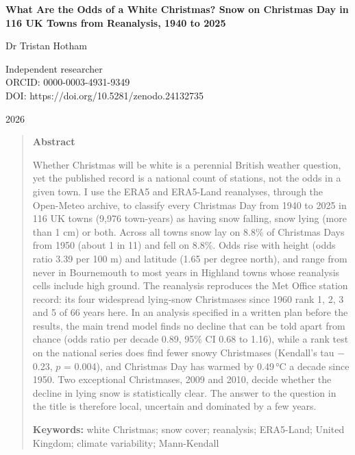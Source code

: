 \documentclass[11pt,a4paper]{article}
\begin{document}
\begin{center}
{\Large\bfseries What Are the Odds of a White Christmas? Snow on Christmas Day in 116 UK Towns from Reanalysis, 1940 to 2025\par}
\vspace{1.2em}
{\large Dr Tristan Hotham\par}
\vspace{0.3em}
{\small Independent researcher\\
ORCID: 0000-0003-4931-9349\\
DOI: https://doi.org/10.5281/zenodo.24132735\par}
\vspace{0.8em}
2026
\end{center}

\begin{quote}
\small
\begin{center}\textbf{Abstract}\end{center}
Whether Christmas will be white is a perennial British weather question, yet the published record is a national count of stations, not the odds in a given town. I use the ERA5 and ERA5-Land reanalyses, through the Open-Meteo archive, to classify every Christmas Day from 1940 to 2025 in 116 UK towns (9,976 town-years) as having snow falling, snow lying (more than 1 cm) or both. Across all towns snow lay on 8.8\% of Christmas Days from 1950 (about 1 in 11) and fell on 8.8\%. Odds rise with height (odds ratio 3.39 per 100 m) and latitude (1.65 per degree north), and range from never in Bournemouth to most years in Highland towns whose reanalysis cells include high ground. The reanalysis reproduces the Met Office station record: its four widespread lying-snow Christmases since 1960 rank 1, 2, 3 and 5 of 66 years here. In an analysis specified in a written plan before the results, the main trend model finds no decline that can be told apart from chance (odds ratio per decade 0.89, 95\% CI 0.68 to 1.16), while a rank test on the national series does find fewer snowy Christmases (Kendall's tau $-$0.23, $p$ = 0.004), and Christmas Day has warmed by 0.49\,°C a decade since 1950. Two exceptional Christmases, 2009 and 2010, decide whether the decline in lying snow is statistically clear. The answer to the question in the title is therefore local, uncertain and dominated by a few years.

\textbf{Keywords:} white Christmas; snow cover; reanalysis; ERA5-Land; United Kingdom; climate variability; Mann-Kendall
\end{quote}
\end{document}
